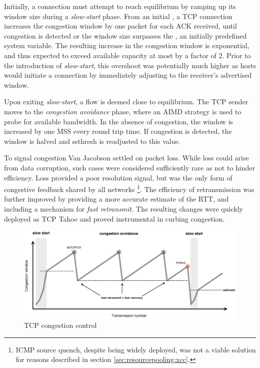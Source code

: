 Initially, a connection must attempt to reach equilibrium by ramping up its window size during a \textit{slow-start} phase. 
From an initial , a \ac{TCP} connection increases the congestion window by one packet for each \ac{ACK} received, until congestion is detected or the window size surpasses the , an initially predefined system variable.
The resulting increase in the congestion window is exponential, and thus expected to exceed available capacity at most by a factor of 2. 
Prior to the introduction of \textit{slow-start}, this overshoot was potentially much higher as hosts would initiate a connection by immediately adjusting to the receiver's advertised window. 

Upon exiting \textit{slow-start}, a flow is deemed close to equilibrium.
The \ac{TCP} sender moves to the \textit{congestion avoidance} phase, where an \ac{AIMD} strategy is used to probe for available bandwidth. 
In the absence of congestion, the window is increased by one \ac{MSS} every round trip time.
If congestion is detected, the window is halved and \ac{ssthresh} is readjusted to this value.

To signal congestion Van Jacobson settled on packet loss. 
While loss could arise from data corruption, such cases were considered sufficiently rare as not to hinder efficiency. 
Loss provided a poor resolution signal, but was the only form of congestive feedback shared by all networks 
\footnote{\ac{ICMP} source quench, despite being widely deployed, was not a viable solution for reasons described in section \ref{sec:resourcepooling:xcc}.}.
The efficiency of retransmission was further improved by providing a more accurate estimate of the \ac{RTT}, and including a mechanism for \textit{fast retransmit}. 
The resulting changes were quickly deployed as \ac{TCP} Tahoe and proved instrumental in curbing congestion. 


\begin{figure}
    \centering
    \includegraphics[width=5.0in]{figures/resourcepooling/tcpnewreno}
    \caption{TCP congestion control}
    \label{fig:tcpcc}
\end{figure}

